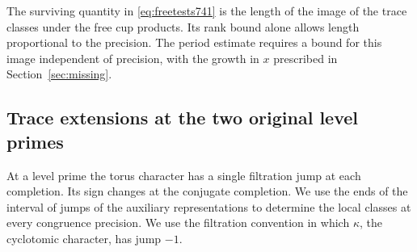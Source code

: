 \documentclass[a4paper,11pt]{article}
\theoremstyle{definition}
\theoremstyle{remark}
\numberwithin{equation}{section}
\begin{document}
The surviving quantity in \eqref{eq:freetests741} is the length
of the image of the trace classes under the free cup products.
Its rank bound alone allows length proportional to the precision.
The period estimate requires a bound for this image independent
of precision, with the growth in \(x\) prescribed in
Section~\ref{sec:missing}.
\clearpage

\subsection{Trace extensions at the two original level primes}
\label{sec:tameends743}

At a level prime the torus character has a single filtration
jump at each completion. Its sign changes at the conjugate
completion. We use the ends of the interval of jumps of the
auxiliary representations to determine the local classes at
every congruence precision. We use the filtration convention
in which \(\kappa\), the cyclotomic character, has jump \(-1\).
\end{document}
